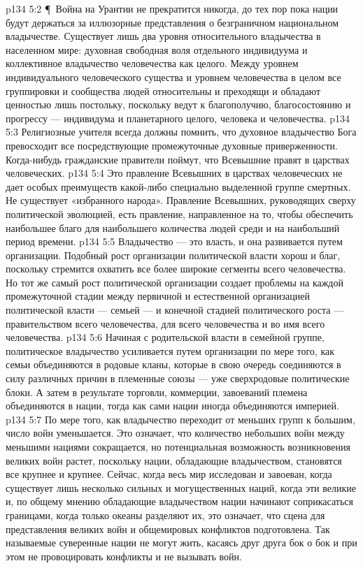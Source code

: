\vs p134 5:2 \P\ Война на Урантии не прекратится никогда, до тех пор пока нации будут держаться за иллюзорные представления о безграничном национальном владычестве. Существует лишь два уровня относительного владычества в населенном мире: духовная свободная воля отдельного индивидуума и коллективное владычество человечества как целого. Между уровнем индивидуального человеческого существа и уровнем человечества в целом все группировки и сообщества людей относительны и преходящи и обладают ценностью лишь постольку, поскольку ведут к благополучию, благосостоянию и прогрессу --- индивидума и планетарного целого, человека и человечества.
\vs p134 5:3 Религиозные учителя всегда должны помнить, что духовное владычество Бога превосходит все посредствующие промежуточные духовные приверженности. Когда\hyp{}нибудь гражданские правители поймут, что Всевышние правят в царствах человеческих.
\vs p134 5:4 Это правление Всевышних в царствах человеческих не дает особых преимуществ какой\hyp{}либо специально выделенной группе смертных. Не существует «избранного народа». Правление Всевышних, руководящих сверху политической эволюцией, есть правление, направленное на то, чтобы обеспечить наибольшее благо для наибольшего количества людей среди  и на наибольший период времени.
\vs p134 5:5 Владычество --- это власть, и она развивается путем организации. Подобный рост организации политической власти хорош и благ, поскольку стремится охватить все более широкие сегменты всего человечества. Но тот же самый рост политической организации создает проблемы на каждой промежуточной стадии между первичной и естественной организацией политической власти --- семьей --- и конечной стадией политического роста --- правительством всего человечества, для всего человечества и во имя всего человечества.
\vs p134 5:6 Начиная с родительской власти в семейной группе, политическое владычество усиливается путем организации по мере того, как семьи объединяются в родовые кланы, которые в свою очередь соединяются в силу различных причин в племенные союзы --- уже сверхродовые политические блоки. А затем в результате торговли, коммерции, завоеваний племена объединяются в нации, тогда как сами нации иногда объединяются империей.
\vs p134 5:7 По мере того, как владычество переходит от меньших групп к большим, число войн уменьшается. Это означает, что количество небольших войн между меньшими нациями сокращается, но потенциальная возможность возникновения великих войн растет, поскольку нации, обладающие владычеством, становятся все крупнее и крупнее. Сейчас, когда весь мир исследован и завоеван, когда существует лишь несколько сильных и могущественных наций, когда эти великие и, по общему мнению обладающие владычеством нации начинают соприкасаться границами, когда только океаны разделяют их, это означает, что сцена для представления великих войн и общемировых конфликтов подготовлена. Так называемые суверенные нации не могут жить, касаясь друг друга бок о бок и при этом не провоцировать конфликты и не вызывать войн.
